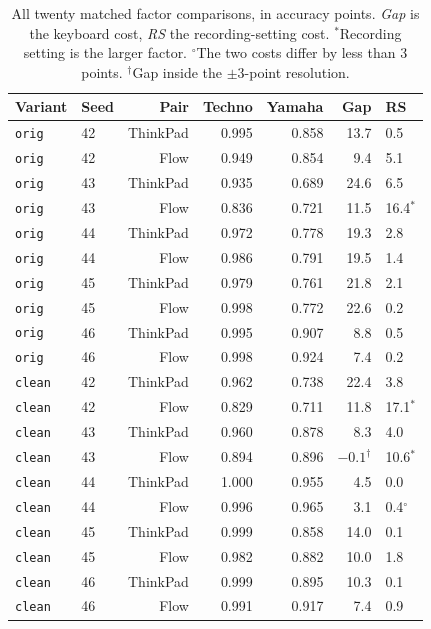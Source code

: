 \documentclass[pdflatex,sn-mathphys-num]{sn-jnl}
\begin{document}
\begin{table}[t]
\caption{All twenty matched factor comparisons, in accuracy points. \emph{Gap} is the keyboard cost, \emph{RS} the recording-setting cost. $^\ast$Recording setting is the larger factor. $^\circ$The two costs differ by less than 3 points. $^\dagger$Gap inside the $\pm3$-point resolution.}\label{tab:esm-factors}
\setlength{\tabcolsep}{4pt}
\begin{tabular}{@{}llrrrrl@{}}
\toprule
Variant & Seed & Pair & Techno & Yamaha & Gap & RS \\
\midrule
\texttt{orig} & 42 & ThinkPad & 0.995 & 0.858 & 13.7 & 0.5 \\
\texttt{orig} & 42 & Flow & 0.949 & 0.854 & 9.4 & 5.1 \\
\texttt{orig} & 43 & ThinkPad & 0.935 & 0.689 & 24.6 & 6.5 \\
\texttt{orig} & 43 & Flow & 0.836 & 0.721 & 11.5 & 16.4$^\ast$ \\
\texttt{orig} & 44 & ThinkPad & 0.972 & 0.778 & 19.3 & 2.8 \\
\texttt{orig} & 44 & Flow & 0.986 & 0.791 & 19.5 & 1.4 \\
\texttt{orig} & 45 & ThinkPad & 0.979 & 0.761 & 21.8 & 2.1 \\
\texttt{orig} & 45 & Flow & 0.998 & 0.772 & 22.6 & 0.2 \\
\texttt{orig} & 46 & ThinkPad & 0.995 & 0.907 & 8.8 & 0.5 \\
\texttt{orig} & 46 & Flow & 0.998 & 0.924 & 7.4 & 0.2 \\
\texttt{clean} & 42 & ThinkPad & 0.962 & 0.738 & 22.4 & 3.8 \\
\texttt{clean} & 42 & Flow & 0.829 & 0.711 & 11.8 & 17.1$^\ast$ \\
\texttt{clean} & 43 & ThinkPad & 0.960 & 0.878 & 8.3 & 4.0 \\
\texttt{clean} & 43 & Flow & 0.894 & 0.896 & $-0.1^\dagger$ & 10.6$^\ast$ \\
\texttt{clean} & 44 & ThinkPad & 1.000 & 0.955 & 4.5 & 0.0 \\
\texttt{clean} & 44 & Flow & 0.996 & 0.965 & 3.1 & 0.4$^\circ$ \\
\texttt{clean} & 45 & ThinkPad & 0.999 & 0.858 & 14.0 & 0.1 \\
\texttt{clean} & 45 & Flow & 0.982 & 0.882 & 10.0 & 1.8 \\
\texttt{clean} & 46 & ThinkPad & 0.999 & 0.895 & 10.3 & 0.1 \\
\texttt{clean} & 46 & Flow & 0.991 & 0.917 & 7.4 & 0.9 \\
\bottomrule
\end{tabular}
\end{table}
\end{document}
